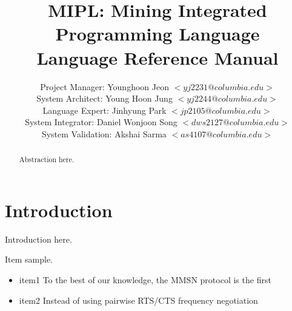 \documentclass[prodmode,acmtecs]{acmsmall}
\begin{document}

\title{{MIPL: Mining Integrated Programming Language\\
Language Reference Manual}}
\author{Project Manager: Younghoon Jeon $<yj2231@columbia.edu>$\\
System Architect: Young Hoon Jung $<yj2244@columbia.edu>$\\
Language Expert: Jinhyung Park $<jp2105@columbia.edu>$\\
System Integrator: Daniel Wonjoon Song $<dws2127@columbia.edu>$\\
System Validation: Akshai Sarma $<as4107@columbia.edu>$
}

\begin{abstract}
Abstraction here.
\end{abstract}






\maketitle


\section{Introduction}

Introduction here.

Item sample.
\begin{itemize}
\item item1 To the best of our knowledge, the MMSN protocol is the first
\item item2 Instead of using pairwise RTS/CTS frequency negotiation
\end{itemize}
\end{document}
